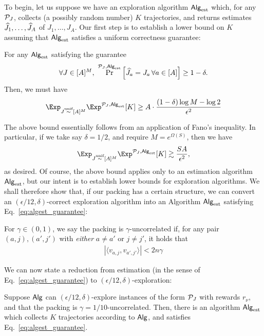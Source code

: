 To begin, let us suppose we have an exploration algorithm $\mathsf{Alg}_{\mathrm{est}}$ which, for any $\mathcal{P}_J$, collects (a possibly random number) $K$ trajectories, and returns estimates $\widehat{J}_1,\dots,\widehat{J}_A$ of $J_1,\dots,J_A$. Our first step is to establish a lower bound on $K$ assuming that $\mathsf{Alg}_{\mathrm{est}}$ satisfies a uniform correctness guarantee: 
\begin{prop}\label{prop:lb_fano_algest} For any $\mathsf{Alg}_{\mathrm{est}}$ satisfying the guarantee
\begin{align}
\forall J \in [A]^M,\,\, \Pr^{\mathcal{P}_J,\mathsf{Alg}_{\mathrm{est}}}\left[\widehat{J}_a = J_a\,\forall a \in [A]\right] \ge 1 - \delta. \label{eq:algest_guarantee}
\end{align}
Then, we must have 
\begin{align*}
\Exp_{J \unifsim [A]^M} \Exp^{\calP_J,\Algest}[K] \ge A \cdot \frac{(1 - \delta)\log M - \log 2}{\epsilon^2}
\end{align*}
\end{prop}
The above bound essentially follows from an application of Fano's inequality. In particular, if we take say $\delta = 1/2$, and require $M = e^{\Omega(S)}$, then we have 
\begin{align*}
\Exp_{J \unifsim [A]^M} \Exp^{\calP_J,\Algest}[K] \gtrsim \frac{SA}{\epsilon^2},
\end{align*}
as desired. Of course, the above bound applies only to an estimation algorithm $\mathsf{Alg}_{\mathrm{est}}$, but our intent is to establish lower bounds for exploration algorithms. We shall therefore show that, if our packing has a certain structure, we can convert an $(\epsilon/12,\delta)$-correct exploration algorithm into an Algorithm $\mathsf{Alg}_{\mathrm{est}}$ satisfying Eq.~\eqref{eq:algest_guarantee}:
\begin{definition} For $\gamma \in (0,1)$, we say the packing is $\gamma$-uncorrelated if, for any pair $(a,j),(a',j')$ with \emph{either} $a \ne a'$ or $j \ne j'$, it holds that
\begin{align*}
|\langle v_{a,j}, v_{a',j'} \rangle| < 2n \gamma 
\end{align*}
\end{definition}
We can now state a reduction from estimation (in the sense of Eq.~\ref{eq:algest_guarantee}) to $ (\epsilon/12,\delta)$-exploration:
\begin{lemma}\label{lem:estimation_reduce_exploration} Suppose $\mathsf{Alg}$ can $(\epsilon/12,\delta)$-explore instances of the form $\mathcal{P}_J$ with rewards $r_{\nu}$, and that the packing is $\gamma = 1/10$-uncorrelated. Then, there is an algorithm $\mathsf{Alg}_{\mathrm{est}}$ which collects $K$ trajectories according to $\mathsf{Alg}$, and satisfies Eq.~\ref{eq:algest_guarantee}.
\end{lemma}
